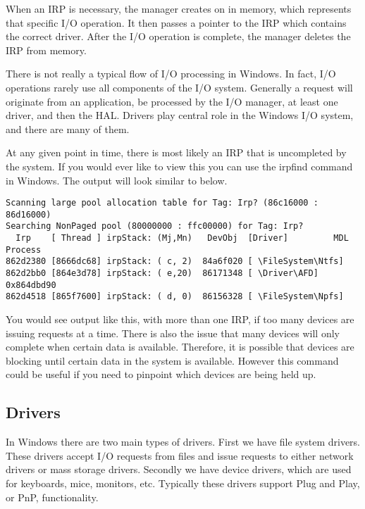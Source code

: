 \documentclass[letterpaper,10pt,titlepage,draftclsnofoot,onecolumn]{IEEEtran}
\begin{document}
When an IRP is necessary, the manager creates on in memory, which represents that specific I/O operation. It then passes a pointer to the IRP which contains the correct driver. After the I/O operation is complete, the manager deletes the IRP from memory. \cite{windows}

There is not really a typical flow of I/O processing in Windows. In fact, I/O operations rarely use all components of the I/O system. Generally a request will originate from an application, be processed by the I/O manager, at least one driver, and then the HAL. Drivers play central role in the Windows I/O system, and there are many of them.

At any given point in time, there is most likely an IRP that is uncompleted by the system. If you would ever like to view this you can use the irpfind command in Windows. The output will look similar to below. 

\begin{lstlisting}
Scanning large pool allocation table for Tag: Irp? (86c16000 : 86d16000)
Searching NonPaged pool (80000000 : ffc00000) for Tag: Irp?
  Irp    [ Thread ] irpStack: (Mj,Mn)   DevObj  [Driver]         MDL Process
862d2380 [8666dc68] irpStack: ( c, 2)  84a6f020 [ \FileSystem\Ntfs]
862d2bb0 [864e3d78] irpStack: ( e,20)  86171348 [ \Driver\AFD] 0x864dbd90
862d4518 [865f7600] irpStack: ( d, 0)  86156328 [ \FileSystem\Npfs]

\end{lstlisting} \cite{windows}

You would see output like this, with more than one IRP, if too many devices are issuing requests at a time. There is also the issue that many devices will only complete when certain data is available. Therefore, it is possible that devices are blocking until certain data in the system is available. However this command could be useful if you need to pinpoint which devices are being held up. 

\subsection{Drivers}
In Windows there are two main types of drivers. First we have file system drivers. These drivers accept I/O requests from files and issue requests to either network drivers or mass storage drivers. Secondly we have device drivers, which are used for keyboards, mice, monitors, etc. Typically these drivers support Plug and Play, or PnP, functionality. \cite{windows}
\end{document}
